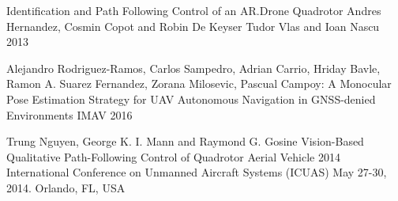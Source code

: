 \documentclass{styles/svproc}
\begin{document}
\begin{thebibliography}{6}
  Identification and Path Following Control of an AR.Drone Quadrotor
  Andres Hernandez, Cosmin Copot and Robin De Keyser Tudor Vlas and Ioan Nascu
  2013

  Alejandro Rodriguez-Ramos, Carlos Sampedro, Adrian Carrio, Hriday Bavle, Ramon A. Suarez Fernandez, Zorana Milosevic, Pascual Campoy:  
  A Monocular Pose Estimation Strategy for UAV Autonomous Navigation in GNSS-denied Environments
  IMAV 2016
  
  Trung Nguyen, George K. I. Mann and Raymond G. Gosine
  Vision-Based Qualitative Path-Following Control of Quadrotor Aerial Vehicle
  2014 International Conference on Unmanned Aircraft Systems (ICUAS) May 27-30, 2014. Orlando, FL, USA



\end{thebibliography}

        
\end{document}
